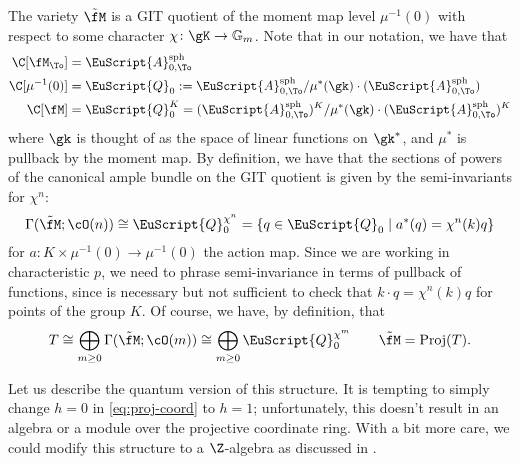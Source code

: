 The variety $\tilde{\fM}$ is a GIT quotient of the moment map level $\mu^{-1}(0)$ with respect to some character $\chi\colon \gK\to \mathbb{G}_m$. Note that in our notation, we have that 
  \begin{align*}
    \C[\fM_{\To}]&=\EuScript{A}_{0,\To}^{\operatorname{sph}}\\
    \C[\mu^{-1}(0)]&=\EuScript{Q}_0:=\EuScript{A}_{0,\To}^{\operatorname{sph}}/\mu^*(\gk)\cdot(\EuScript{A}_{0,\To}^{\operatorname{sph}})\\
    \C[\fM]&=\EuScript{Q}_0^K= (\EuScript{A}_{0,\To}^{\operatorname{sph}})^K/\mu^*(\gk)\cdot(\EuScript{A}_{0,\To}^{\operatorname{sph}})^K
  \end{align*}
  where $\gk$ is thought of as the space of linear functions on $\gk^*$, and $\mu^*$ is pullback by the moment map.    
  By definition, we have that the sections of powers of the canonical ample bundle on the GIT quotient is given by the semi-invariants for $\chi^n$:
  \begin{equation*}
    \Gamma(\tilde{\fM};\cO(n))\cong \EuScript{Q}_0^{\chi^n} =\{q\in \EuScript{Q}_0\mid a^*( q)=\chi^n(k)q \} 
  \end{equation*}
  for $a\colon K\times \mu^{-1}(0)\to \mu^{-1}(0) $ the action map. Since we are working in characteristic $p$, we need to phrase semi-invariance in terms of pullback of functions, since is necessary but not sufficient to check that $k\cdot q=\chi^n(k)q$ for points of the group $K$.  Of course, we have, by definition, that
  \begin{equation}
T\cong \bigoplus_{m\geq 0}\Gamma(\tilde{\fM};\cO(m))\cong \bigoplus_{m\geq 0}\EuScript{Q}_0^{\chi^m}\qquad \tilde{\fM}=\operatorname{Proj}(T).\label{eq:proj-coord}
\end{equation}

  Let us describe the quantum version of this structure.  It is tempting to simply change $h=0$ in \eqref{eq:proj-coord} to $h=1$; unfortunately, this doesn't result in an algebra
  or a module over the projective coordinate ring.  With a bit more care, we could modify this structure to a $\Z$-algebra as discussed in \cite[\S 5.5]{BLPWquant}.

